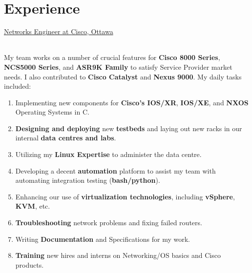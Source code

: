 \documentclass[letterpaper]{twentysecondcv} %
\begin{document}

\section{Experience}

\begin{twenty}

           {\underline{Networks Engineer at \textcolor{OliveGreen}{Cisco}, Ottawa}}
           {}
           {\\
            My team works on a number of crucial features for \textbf{Cisco 8000 Series}, 
            \textbf{NCS5000 Series}, and \textbf{ASR9K Family} to satisfy Service Provider
            market needs. I also contributed to \textbf{Cisco Catalyst} and \textbf{Nexus 9000}.
            My daily tasks included:
            \\
            \begin{enumerate}
               \item{Implementing new components for \textbf{Cisco's IOS/XR}, \textbf{IOS/XE}, and \textbf{NXOS} Operating Systems in C.}
               \item{\textbf{Designing and deploying} new \textbf{testbeds} and laying out new racks in our internal \textbf{data centres and labs}.}               
               \item{Utilizing my \textbf{Linux Expertise} to administer the data centre.}
               \item{Developing a decent \textbf{automation} platform to assist my team with automating integration testing (\textbf{bash/python}).}
               \item{Enhancing our use of \textbf{virtualization technologies}, including \textbf{vSphere}, \textbf{KVM}, etc.}
               \item{\textbf{Troubleshooting} network problems and fixing failed routers.}
               \item{Writing \textbf{Documentation} and Specifications for my work.}
               \item{\textbf{Training} new hires and interns on Networking/OS basics and Cisco products.}
            \end{enumerate}
           }


\end{twenty}
\end{document}
